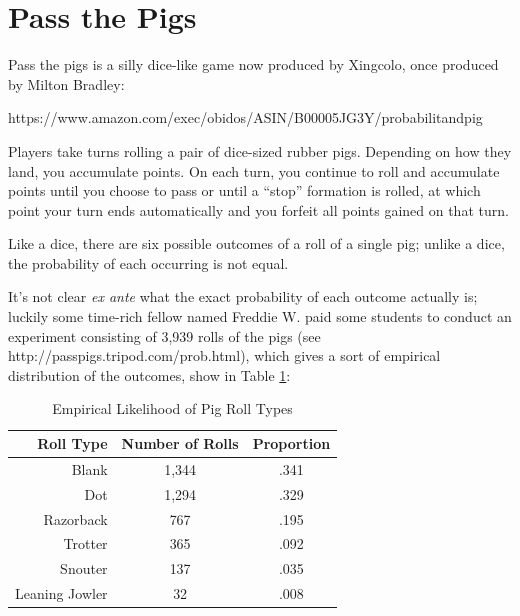 \documentclass{article}
\begin{document}
\section{Pass the Pigs}

Pass the pigs is a silly dice-like game now produced by Xingcolo, once produced by Milton Bradley:

https://www.amazon.com/exec/obidos/ASIN/B00005JG3Y/probabilitandpig

Players take turns rolling a pair of dice-sized rubber pigs. Depending on how they land, you accumulate points. On each turn, you continue to roll and accumulate points until you choose to pass or until a ``stop'' formation is rolled, at which point your turn ends automatically and you forfeit all points gained on that turn. 

Like a dice, there are six possible outcomes of a roll of a single pig; unlike a dice, the probability of each occurring is not equal.

It's not clear \textit{ex ante} what the exact probability of each outcome actually is; luckily some time-rich fellow named Freddie W. paid some students to conduct an experiment consisting of 3,939 rolls of the pigs (see http://passpigs.tripod.com/prob.html), which gives a sort of empirical distribution of the outcomes, show in Table \ref{tbl:pigout}:

\begin{table}[htbp]
\centering
\begin{tabular}{|r|c|c|}
\hline
Roll Type & Number of Rolls & Proportion \\
\hline
Blank & 1,344 & .341 \\
\hline
Dot & 1,294 & .329 \\
\hline
Razorback & 767 & .195 \\
\hline
Trotter & 365 & .092 \\
\hline
Snouter & 137 & .035 \\
\hline
Leaning Jowler & 32 & .008 \\
\hline
\end{tabular}
\caption{Empirical Likelihood of Pig Roll Types}
\label{tbl:pigout}
\end{table}
\end{document}
